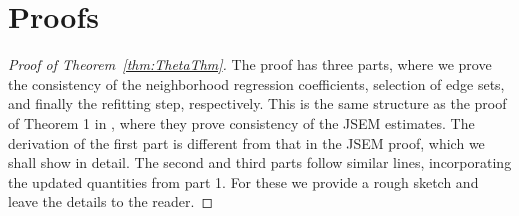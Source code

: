 \documentclass[12pt, letterpaper]{article}
\theoremstyle{definition}
\numberwithin{equation}{section}
\begin{document}
\section{Proofs}
\begin{proof}[Proof of Theorem~\ref{thm:ThetaThm}]
The proof has three parts, where we prove the consistency of the neighborhood regression coefficients, selection of edge sets, and finally the refitting step, respectively. This is the same structure as the proof of Theorem 1 in \cite{MaMichailidis15}, where they prove consistency of the JSEM estimates. The derivation of the first part is different from that in the JSEM proof, which we shall show in detail. The second and third parts follow similar lines, incorporating the updated quantities from part 1. For these we provide a rough sketch and leave the details to the reader.


\end{proof}
\end{document}
